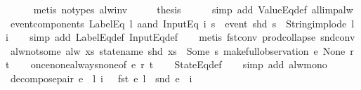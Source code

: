 \begin{isabellebody}
\ \ \ \ \isamarkupfalse%
\ {\isacharparenleft}metis\ {\isacharparenleft}no{\isacharunderscore}types{\isacharparenright}\ alw{\isacharunderscore}inv{\isacharparenright}\isanewline
\ \ \isamarkupfalse%
\ \isamarkupfalse%
\ {\isacharquery}thesis\isanewline
\ \ \ \ \isamarkupfalse%
\ {\isacharparenleft}simp\ add{\isacharcolon}\ ValueEq{\isacharunderscore}def\ all{\isacharunderscore}imp{\isacharunderscore}alw{\isacharparenright}\isanewline
{}\isamarkupfalse%
%
\endisatagproof
{\isafoldproof}%
%
\isadelimproof
\isanewline
%
\endisadelimproof
\isanewline
{}\isamarkupfalse%
\ event{\isacharunderscore}components{\isacharcolon}\ {\isachardoublequoteopen}{\isacharparenleft}LabelEq\ l\ aand\ InputEq\ i{\isacharparenright}\ s\ {\isacharequal}\ {\isacharparenleft}event\ {\isacharparenleft}shd\ s{\isacharparenright}\ {\isacharequal}\ {\isacharparenleft}String{\isachardot}implode\ l{\isacharcomma}\ i{\isacharparenright}{\isacharparenright}{\isachardoublequoteclose}\isanewline
%
\isadelimproof
\ \ %
\endisadelimproof
%
\isatagproof
{}\isamarkupfalse%
\ {\isacharparenleft}simp\ add{\isacharcolon}\ LabelEq{\isacharunderscore}def\ InputEq{\isacharunderscore}def{\isacharparenright}\isanewline
\ \ \isamarkupfalse%
\ {\isacharparenleft}metis\ fst{\isacharunderscore}conv\ prod{\isachardot}collapse\ snd{\isacharunderscore}conv{\isacharparenright}%
\endisatagproof
{\isafoldproof}%
%
\isadelimproof
\isanewline
%
\endisadelimproof
\isanewline
{}\isamarkupfalse%
\ alw{\isacharunderscore}not{\isacharunderscore}some{\isacharcolon}\ {\isachardoublequoteopen}alw\ {\isacharparenleft}{\isasymlambda}xs{\isachardot}\ statename\ {\isacharparenleft}shd\ xs{\isacharparenright}\ {\isasymnoteq}\ Some\ s{\isacharparenright}\ {\isacharparenleft}make{\isacharunderscore}full{\isacharunderscore}observation\ e\ None\ r\ t{\isacharparenright}{\isachardoublequoteclose}\isanewline
%
\isadelimproof
\ \ %
\endisadelimproof
%
\isatagproof
{}\isamarkupfalse%
\ once{\isacharunderscore}none{\isacharunderscore}always{\isacharunderscore}none{\isacharbrackleft}of\ e\ r\ t{\isacharbrackright}\isanewline
\ \ \isamarkupfalse%
\ StateEq{\isacharunderscore}def\isanewline
\ \ \isamarkupfalse%
\ {\isacharparenleft}simp\ add{\isacharcolon}\ alw{\isacharunderscore}mono{\isacharparenright}%
\endisatagproof
{\isafoldproof}%
%
\isadelimproof
\isanewline
%
\endisadelimproof
\isanewline
{}\isamarkupfalse%
\ decompose{\isacharunderscore}pair{\isacharcolon}\ {\isachardoublequoteopen}e\ {\isasymnoteq}\ {\isacharparenleft}l{\isacharcomma}\ i{\isacharparenright}\ {\isacharequal}\ {\isacharparenleft}{\isasymnot}\ {\isacharparenleft}fst\ e\ {\isacharequal}l\ {\isasymand}\ snd\ e\ {\isacharequal}\ i{\isacharparenright}{\isacharparenright}{\isachardoublequoteclose}\isanewline

\end{isabellebody}
